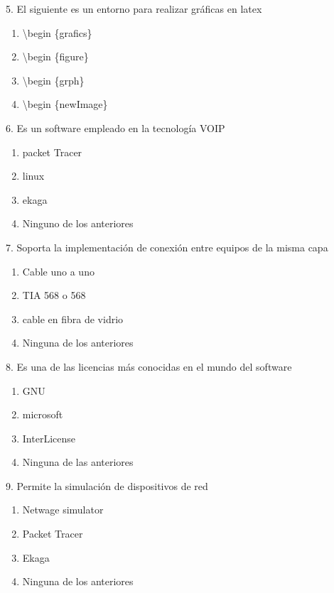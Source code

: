 \documentclass{article}
\begin{document}
5. El siguiente es un entorno para realizar gráficas en latex

\begin{enumerate}[label=(\Alph*)]
\item \textbackslash begin \{grafics\}
\item   \textbackslash begin \{figure\}
\item  \textbackslash begin \{grph\}
\item  \textbackslash begin \{newImage\}



\end{enumerate} 

6. Es un software empleado en la tecnología VOIP


\begin{enumerate}[label=(\Alph*)]
\item packet Tracer
\item linux
\item ekaga
\item Ninguno de los anteriores
\end{enumerate} 

7. Soporta la implementación de conexión entre equipos de la misma capa

\begin{enumerate}[label=(\Alph*)]
\item Cable uno a uno
\item TIA 568 o 568
\item cable en fibra de vidrio
\item Ninguna de los anteriores
\end{enumerate} 


8. Es una de las licencias más conocidas en el mundo del software

\begin{enumerate}[label=(\Alph*)]
\item GNU
\item microsoft
\item InterLicense
\item Ninguna de las anteriores
\end{enumerate} 


9. Permite la simulación de dispositivos de red  

\begin{enumerate}[label=(\Alph*)]
\item Netwage simulator
\item Packet Tracer
\item Ekaga
\item Ninguna de los anteriores
\end{enumerate} 
\end{document}

